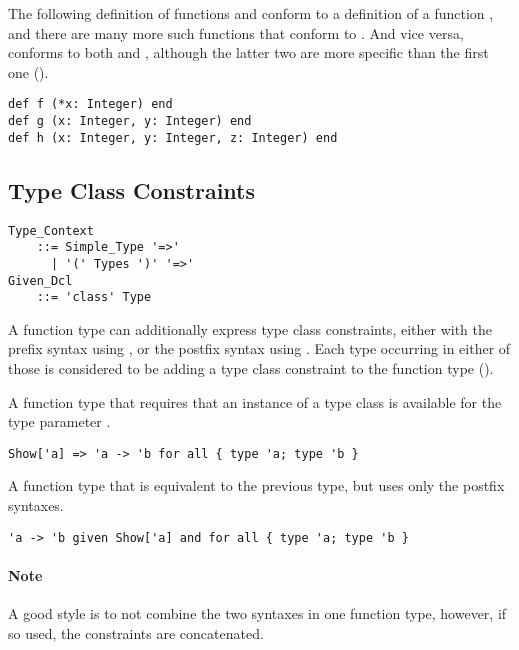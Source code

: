 \example The following definition of functions  and  conform to a definition of a function , and there are many more such functions that conform to . And vice versa,  conforms to both  and , although the latter two are more specific than the first one (). 
\begin{lstlisting}
def f (*x: Integer) end
def g (x: Integer, y: Integer) end
def h (x: Integer, y: Integer, z: Integer) end
\end{lstlisting}





\subsection{Type Class Constraints}

\grammar\begin{lstlisting}
Type_Context 
    ::= Simple_Type '=>'
      | '(' Types ')' '=>'
Given_Dcl
    ::= 'class' Type
\end{lstlisting}

A function type can additionally express type class constraints, either with the prefix syntax using , or the postfix syntax using . Each type occurring in either of those is considered to be adding a type class constraint to the function type (). 

\example A function type that requires that an instance of a type class  is available for the type parameter .
\begin{lstlisting}
Show['a] => 'a -> 'b for all { type 'a; type 'b }
\end{lstlisting}

\example A function type that is equivalent to the previous type, but uses only the postfix syntaxes. 
\begin{lstlisting}
'a -> 'b given Show['a] and for all { type 'a; type 'b }
\end{lstlisting}

\paragraph{Note}
A good style is to not combine the two syntaxes in one function type, however, if so used, the constraints are concatenated. 





